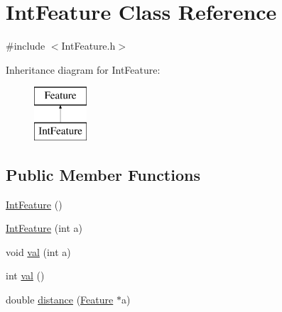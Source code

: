 \hypertarget{class_int_feature}{\section{Int\+Feature Class Reference}
\label{class_int_feature}
}


{\ttfamily \#include $<$Int\+Feature.\+h$>$}

Inheritance diagram for Int\+Feature\+:\begin{figure}[H]
\begin{center}
\leavevmode
\includegraphics[height=2.000000cm]{class_int_feature}
\end{center}
\end{figure}
\subsection*{Public Member Functions}
\begin{DoxyCompactItemize}
\item 
\hyperlink{class_int_feature_accb2be99097e153df7abfde70894a9d2}{Int\+Feature} ()
\item 
\hyperlink{class_int_feature_aef75cf64b6b58c3b40b9ec607b8444f3}{Int\+Feature} (int a)
\item 
void \hyperlink{class_int_feature_aab965223e7190c970442ab059f8702ee}{val} (int a)
\item 
int \hyperlink{class_int_feature_a0293bade02b37e96c75e04b58b9b7146}{val} ()
\item 
double \hyperlink{class_int_feature_a629ca66179636f0e1e673b017fdbd95e}{distance} (\hyperlink{class_feature}{Feature} $\ast$a)
\end{DoxyCompactItemize}


